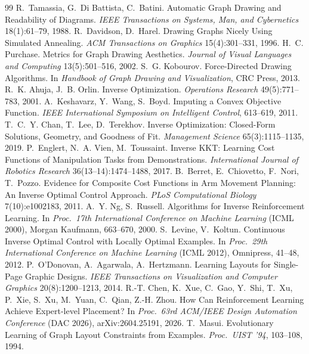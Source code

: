 \documentclass[11pt]{article}
\begin{document}
{\footnotesize
\begin{thebibliography}{99}
 R.~Tamassia, G.~Di Battista, C.~Batini. Automatic Graph Drawing and
 Readability of Diagrams. \emph{IEEE Transactions on Systems, Man, and Cybernetics}
 18(1):61--79, 1988.
 R.~Davidson, D.~Harel. Drawing Graphs Nicely Using Simulated Annealing.
 \emph{ACM Transactions on Graphics} 15(4):301--331, 1996.
 H.~C. Purchase. Metrics for Graph Drawing Aesthetics. \emph{Journal
 of Visual Languages and Computing} 13(5):501--516, 2002.
 S.~G. Kobourov. Force-Directed Drawing Algorithms. In \emph{Handbook
 of Graph Drawing and Visualization}, CRC Press, 2013.
 R.~K. Ahuja, J.~B. Orlin. Inverse Optimization. \emph{Operations
 Research} 49(5):771--783, 2001.
 A.~Keshavarz, Y.~Wang, S.~Boyd. Imputing a Convex Objective Function.
 \emph{IEEE International Symposium on Intelligent Control}, 613--619, 2011.
 T.~C.~Y. Chan, T.~Lee, D.~Terekhov. Inverse Optimization: Closed-Form
 Solutions, Geometry, and Goodness of Fit. \emph{Management Science} 65(3):1115--1135,
 2019.
 P.~Englert, N.~A. Vien, M.~Toussaint. Inverse KKT: Learning Cost
 Functions of Manipulation Tasks from Demonstrations. \emph{International Journal of
 Robotics Research} 36(13--14):1474--1488, 2017.
 B.~Berret, E.~Chiovetto, F.~Nori, T.~Pozzo. Evidence for Composite Cost
 Functions in Arm Movement Planning: An Inverse Optimal Control Approach. \emph{PLoS
 Computational Biology} 7(10):e1002183, 2011.
 A.~Y. Ng, S.~Russell. Algorithms for Inverse Reinforcement Learning. In
 \emph{Proc.\ 17th International Conference on Machine Learning} (ICML 2000), Morgan
 Kaufmann, 663--670, 2000.
 S.~Levine, V.~Koltun. Continuous Inverse Optimal Control with Locally
 Optimal Examples. In \emph{Proc.\ 29th International Conference on Machine Learning}
 (ICML 2012), Omnipress, 41--48, 2012.
 P.~O'Donovan, A.~Agarwala, A.~Hertzmann. Learning Layouts for
 Single-Page Graphic Designs. \emph{IEEE Transactions on Visualization and Computer
 Graphics} 20(8):1200--1213, 2014.
 R.-T. Chen, K.~Xue, C.~Gao, Y.~Shi, T.~Xu, P.~Xie, S.~Xu, M.~Yuan,
 C.~Qian, Z.-H. Zhou. How Can Reinforcement Learning Achieve Expert-level Placement? In
 \emph{Proc.\ 63rd ACM/IEEE Design Automation Conference} (DAC 2026), arXiv:2604.25191,
 2026.
 T.~Masui. Evolutionary Learning of Graph Layout Constraints from
 Examples. \emph{Proc.\ UIST '94}, 103--108, 1994.

\end{thebibliography}}
\end{document}
